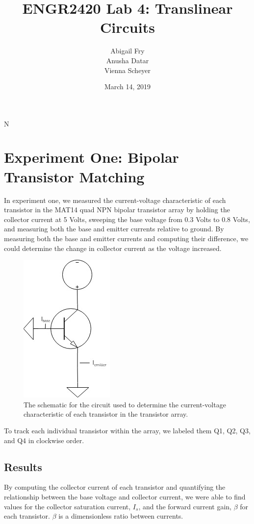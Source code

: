 N\documentclass{article}
\title{ENGR2420 Lab 4: Translinear Circuits}
\author{Abigail Fry \\ Anusha Datar \\ Vienna Scheyer}
\date{March 14, 2019}
\begin{document}
\maketitle
\section{Experiment One: Bipolar Transistor Matching}
In experiment one, we measured the current-voltage characteristic of each transistor in the MAT14 quad NPN bipolar transistor array by holding the collector current at 5 Volts, sweeping the base voltage from 0.3 Volts to 0.8 Volts, and measuring both the base and emitter currents relative to ground. By measuring both the base and emitter currents and computing their difference, we could determine the change in collector current as the voltage increased.

\begin{figure}[H]   
  \centering        
  \includegraphics[scale = 0.5]{images/experiment_one_schematic.jpg}
  \caption{The schematic for the circuit used to determine the current-voltage characteristic of each transistor in the transistor array.}   
  \label{fig:exp1_sch}
\end{figure}

To track each individual transistor within the array, we labeled them Q1, Q2, Q3, and Q4 in clockwise order.

\subsection{Results}
By computing the collector current of each transistor and quantifying the relationship between the base voltage and collector current, we were able to find values for the collector saturation current, $I_s$, and the forward current gain, $\beta$ for each transistor. $\beta$ is a dimensionless ratio between currents.
\end{document}
